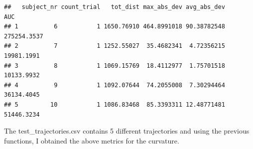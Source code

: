 \documentclass[]{article}
\begin{document}
\begin{verbatim}
##   subject_nr count_trial   tot_dist max_abs_dev avg_abs_dev         AUC
## 1          6           1 1650.76910 464.8991018 90.38782548 275254.3537
## 2          7           1 1252.55027  35.4682341  4.72356215  19981.1991
## 3          8           1 1069.15769  18.4112977  1.75701518  10133.9932
## 4          9           1 1092.07644  74.2055008  7.30294464  36134.4045
## 5         10           1 1086.83468  85.3393311 12.48771481  51446.3234
\end{verbatim}

The test\_trajectories.csv contains 5 different trajectories and using
the previous functions, I obtained the above metrics for the curvature.
\end{document}

